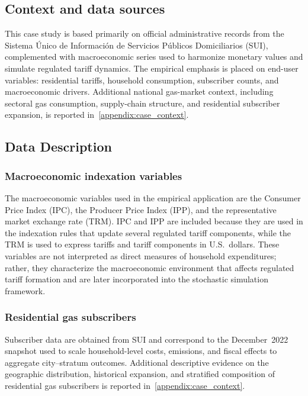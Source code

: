 \documentclass[authoryear,preprint,review,10pt]{elsarticle}
\begin{document}
\subsection{Context and data sources}
\label{sec:context_data_sources}

This case study is based primarily on official administrative records from the Sistema Único de Información de Servicios Públicos Domiciliarios (SUI), complemented with macroeconomic series used to harmonize monetary values and simulate regulated tariff dynamics. The empirical emphasis is placed on end-user variables: residential tariffs, household consumption, subscriber counts, and macroeconomic drivers. Additional national gas-market context, including sectoral gas consumption, supply-chain structure, and residential subscriber expansion, is reported in~\ref{appendix:case_context}.

\subsection{Data Description}

\subsubsection{Macroeconomic indexation variables}

The macroeconomic variables used in the empirical application are the Consumer Price Index (IPC), the Producer Price Index (IPP), and the representative market exchange rate (TRM). IPC and IPP are included because they are used in the indexation rules that update several regulated tariff components, while the TRM is used to express tariffs and tariff components in U.S.\ dollars. These variables are not interpreted as direct measures of household expenditures; rather, they characterize the macroeconomic environment that affects regulated tariff formation and are later incorporated into the stochastic simulation framework.

\subsubsection{Residential gas subscribers}

Subscriber data are obtained from SUI and correspond to the December~2022 snapshot used to scale household-level costs, emissions, and fiscal effects to aggregate city--stratum outcomes. Additional descriptive evidence on the geographic distribution, historical expansion, and stratified composition of residential gas subscribers is reported in~\ref{appendix:case_context}.
\end{document}
